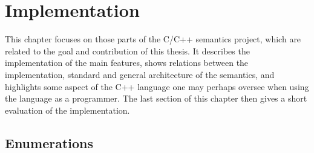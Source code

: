 \documentclass{fithesis3}
\begin{document}




\chapter{Implementation}

This chapter focuses on those parts of the C/C++ semantics project, which are related to the goal and contribution of this thesis. It describes the implementation of the main features, shows relations between the implementation, standard and general architecture of the semantics, and highlights some aspect of the C++ language one may perhaps oversee when using the language as a programmer. The last section of this chapter then gives a short evaluation of the implementation.

	


\section{Enumerations}








\end{document}
